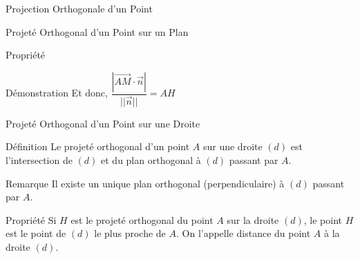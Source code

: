 \documentclass{cours}
\begin{document}
\begin{Gpartie}{Projection Orthogonale d'un Point}
\begin{Spartie}{Projeté Orthogonal d'un Point sur un Plan}
\begin{SSSpartie}{Propriété}
\begin{SSSSpartie}{Démonstration}
                    Et donc, $\dfrac{\left\lvert\overrightarrow{AM}\cdot\vec{n}\right\rvert}{\lvert\lvert\vec{n}\rvert\rvert}=AH$
                \end{SSSSpartie}
            \end{SSSpartie}
        \end{Spartie}
        \begin{Spartie}{Projeté Orthogonal d'un Point sur une Droite} 
            \begin{SSpartie}{Définition} 
                Le projeté orthogonal d'un point $A$ sur une droite $(d)$ est l'intersection de $(d)$ et du plan orthogonal à $(d)$ passant par $A$.
            \end{SSpartie}
            \begin{SSpartie}{Remarque} 
                Il existe un unique plan orthogonal (perpendiculaire) à $(d)$ passant par $A$.
            \end{SSpartie}
            \begin{SSpartie}{Propriété} 
                Si $H$ est le projeté orthogonal du point $A$ sur la droite $(d)$, le point $H$ est le point de $(d)$ le plus proche de $A$. On l'appelle distance du point $A$ à la droite $(d)$.
            \end{SSpartie}
        \end{Spartie}
    \end{Gpartie}
\end{document}

